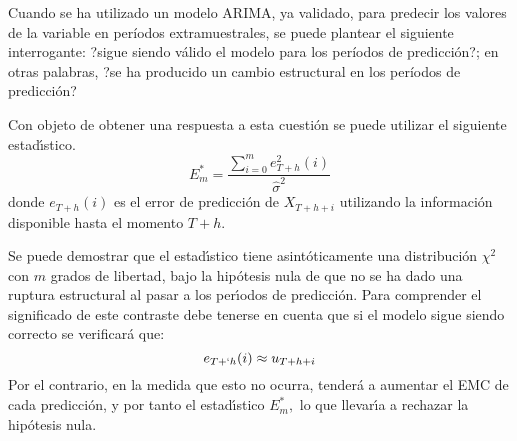 Cuando se ha utilizado un modelo ARIMA, ya validado, para predecir los valores de la variable en 
per\'{i}odos extramuestrales, se puede plantear el siguiente interrogante: 
?sigue siendo v\'{a}lido el modelo para los per\'{i}odos de 
predicci\'{o}n?; en otras palabras, ?se ha producido un cambio estructural 
en los per\'{i}odos de predicci\'{o}n?

Con objeto de obtener una respuesta a esta cuesti\'{o}n se puede utilizar el 
siguiente estad\'{\i}stico.
\begin{equation}\label{eq:3.05}
 E_{m}^{\ast }=\frac{\sum_{i=0}^m {e_{T+h}^{2}(i)} }{\widehat{\sigma 
}^{2}} 
\end{equation}
donde $e_{T+h}( i)$ es el error de predicci\'{o}n de 
$X_{T+h+i} $ utilizando la informaci\'{o}n disponible hasta el momento 
$T+h.$

Se puede demostrar que el estad\'{\i}stico tiene asint\'{o}ticamente una 
distribuci\'{o}n $\chi^{2}$ con $m$ grados de libertad, bajo la 
hip\'{o}tesis nula de que no se ha dado una ruptura estructural al pasar a 
los per\'{\i}odos de predicci\'{o}n. Para comprender el significado de este 
contraste debe tenerse en cuenta que si el modelo sigue siendo correcto se 
verificar\'{a} que:
\[
e_{T+`h} ( i )\approx u_{T+h+i} 
\]
Por el contrario, en la medida que esto no ocurra, tender\'{a} a aumentar el 
EMC de cada predicci\'{o}n, y por tanto el estad\'{\i}stico $E_{m}^{\ast},$ lo que llevar\'{\i}a a rechazar la hip\'{o}tesis nula.

